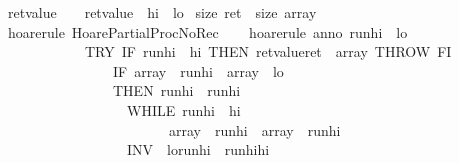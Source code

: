 \begin{isabellebody}
{\isasymlbrace}\ {\isacharparenleft}{\isasymacute}ret{\isacharunderscore}value\ {\isasymge}\ {}\ {\isasymand}\ {\isasymacute}ret{\isacharunderscore}value\ {\isasymle}\ \isactrlbsup {\isasymsigma}\isactrlesup hi\ {\isacharminus}\ \isactrlbsup {\isasymsigma}\isactrlesup lo{\isacharparenright}\ {\isasymand}\isanewline
{\isacharparenleft}size\ {\isasymacute}ret\ {\isacharequal}\ size\ \isactrlbsup {\isasymsigma}\isactrlesup array{\isacharparenright}\ \isanewline
{\isasymrbrace}\isanewline
{\isachardoublequoteclose}\isanewline
%
\isadelimproof
\ \ %
\endisadelimproof
%
\isatagproof
{}\isamarkupfalse%
\ {\isacharparenleft}hoare{\isacharunderscore}rule\ HoarePartial{\isachardot}ProcNoRec{}{\isacharparenright}\isanewline
\ \ \isamarkupfalse%
\ {\isacharparenleft}hoare{\isacharunderscore}rule\ anno{\isacharequal}{\isachardoublequoteopen}\ {\isasymacute}run{\isacharunderscore}hi\ {\isacharcolon}{\isacharequal}{\isacharequal}\ {\isasymacute}lo\ {\isacharplus}\ {}{\isacharsemicolon}{\isacharsemicolon}\isanewline
\ \ \ \ \ \ \ \ \ \ \ \ TRY\ IF\ {\isasymacute}run{\isacharunderscore}hi\ {\isacharequal}\ {\isasymacute}hi\ THEN\ {\isasymacute}ret{\isacharunderscore}value{\isacharcolon}{\isacharequal}{\isacharequal}{}{\isacharsemicolon}{\isacharsemicolon}{\isasymacute}ret\ {\isacharcolon}{\isacharequal}{\isacharequal}\ {\isasymacute}array{\isacharsemicolon}{\isacharsemicolon}\ THROW\ FI{\isacharsemicolon}{\isacharsemicolon}\isanewline
\ \ \ \ \ \ \ \ \ \ \ \ \ \ \ \ IF\ {\isasymacute}array\ {\isacharbang}\ {\isasymacute}run{\isacharunderscore}hi\ {\isacharless}\ {\isasymacute}array\ {\isacharbang}\ {\isasymacute}lo\isanewline
\ \ \ \ \ \ \ \ \ \ \ \ \ \ \ \ THEN\ {\isasymacute}run{\isacharunderscore}hi\ {\isacharcolon}{\isacharequal}{\isacharequal}\ {\isasymacute}run{\isacharunderscore}hi\ {\isacharplus}\ {}{\isacharsemicolon}{\isacharsemicolon}\isanewline
\ \ \ \ \ \ \ \ \ \ \ \ \ \ \ \ \ \ WHILE\ {\isasymacute}run{\isacharunderscore}hi\ {\isacharless}\ {\isasymacute}hi\ {\isasymand}\isanewline
\ \ \ \ \ \ \ \ \ \ \ \ \ \ \ \ \ \ \ \ \ \ \ \ {\isasymacute}array\ {\isacharbang}\ {\isasymacute}run{\isacharunderscore}hi\ {\isacharless}\ {\isasymacute}array\ {\isacharbang}\ {\isacharparenleft}{\isasymacute}run{\isacharunderscore}hi\ {\isacharminus}\ {}{\isacharparenright}\isanewline
\ \ \ \ \ \ \ \ \ \ \ \ \ \ \ \ \ \ INV\ {\isasymlbrace}\ {\isasymacute}lo{\isacharless}{\isasymacute}run{\isacharunderscore}hi\ {\isasymand}\ {\isasymacute}run{\isacharunderscore}hi{\isasymle}{\isasymacute}hi\ {\isasymand}\isanewline

\end{isabellebody}
